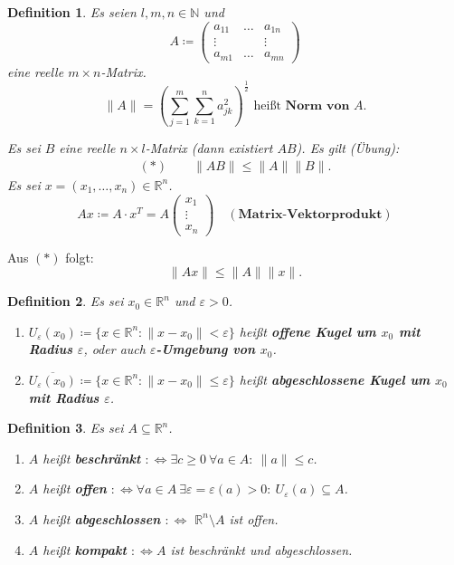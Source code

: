 \documentclass[12pt]{extreport} %
\newcommand{\N}{\mathbb{N}}
\newcommand{\R}{\mathbb{R}}
\theoremstyle{named}
\theoremstyle{itshape}
\newtheorem*{definition}{Definition}
\theoremstyle{normal}
\begin{document}
{
\begin{definition}
	Es seien $l, m, n \in \N$ und $$A \coloneqq \begin{pmatrix} a_{11} & \dotsc	& a_{1n} \\ \vdots & & \vdots \\ a_{m1} & \dotsc & a_{mn} \end{pmatrix}$$
	eine reelle $m \times n$-Matrix.
	$$ \| A \| = \left( \sum_{j=1}^{m} \sum_{k=1}^{n} a_{jk}^{2} \right)^{\frac{1}{2}} \text{ hei{\ss}t} \textbf{ Norm von $A$}.	 $$

	Es sei $B$ eine reelle $n \times l$-Matrix (dann existiert $AB$). Es gilt (Übung):
	\begin{align*}
	(\ast) \quad \quad	\|AB\| \leq \|A\| \|B\|.	
	\end{align*}
	Es sei $x = (x_{1}, \dotsc, x_{n}) \in \R^{n}$.
	$$ A x \coloneqq A \cdot x^{T} = A \begin{pmatrix} x_{1} \\ \vdots \\ x_{n} \end{pmatrix} \quad (\textbf{Matrix-Vektorprodukt}) $$
\end{definition}

Aus $(*)$ folgt: $$\| A x \| \leq \| A \| \| x \|.$$

   
\begin{definition}
	Es sei $x_{0} \in \R^{n}$ und $\varepsilon > 0$.
	\begin{enumerate}
		\item $U_{\varepsilon}(x_{0}) \coloneqq \{ x \in \R^{n}: \| x - x_{0} \| < \varepsilon \}$ hei{\ss}t \textbf{offene Kugel um $x_{0}$ mit Radius $\varepsilon$}, 
		oder auch \textbf{$\varepsilon$-Umgebung von $x_{0}$}.
		\item $\overline{U_{\varepsilon}(x_{0})} \coloneqq \{ x \in \R^{n}: \| x - x_{0} \| \leq \varepsilon \}$ hei{\ss}t \textbf{abgeschlossene Kugel um $x_{0}$ mit 
		Radius $\varepsilon$}. 
	\end{enumerate}
\end{definition}

   
\begin{definition}
	Es sei $A \subseteq \R^{n}$.
	\begin{enumerate}
		\item $A$ hei{\ss}t \textbf{beschränkt} $:\iff \exists c \geq 0 ~\forall a \in A: ~ \| a \| \leq c$.
		\item $A$ hei{\ss}t \textbf{offen} $:\iff \forall a \in A ~\exists \varepsilon = \varepsilon(a) > 0: ~ U_{\varepsilon}(a) \subseteq A$. 
		\item $A$ hei{\ss}t \textbf{abgeschlossen} $:\iff$ $\R^{n} \setminus A$ ist offen.
		\item $A$ hei{\ss}t \textbf{kompakt} $:\iff A$ ist beschränkt und abgeschlossen.
	\end{enumerate}
\end{definition}


}
\end{document}
